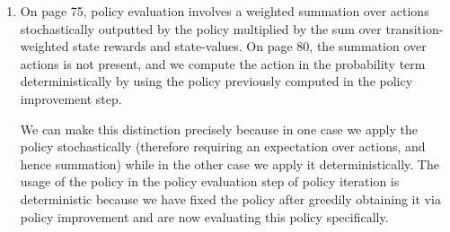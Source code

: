 \documentclass[
]{article}
\begin{document}
\begin{enumerate}
\item
  \par On page 75, policy evaluation involves a weighted summation over actions stochastically outputted
  by the policy multiplied by the sum over transition-weighted state rewards and state-values. On
  page 80, the summation over actions is not present, and we compute the action in the probability
  term deterministically by using the policy previously computed in the policy improvement step. 
  \par We can make this distinction precisely because in one case we apply the policy stochastically
  (therefore requiring an expectation over actions, and hence summation) while in the other case we
  apply it deterministically. The usage of the policy in the policy evaluation step of policy
  iteration is deterministic because we have fixed the policy after greedily obtaining it via policy
  improvement and are now evaluating this policy specifically.

\end{enumerate}
\end{document}
